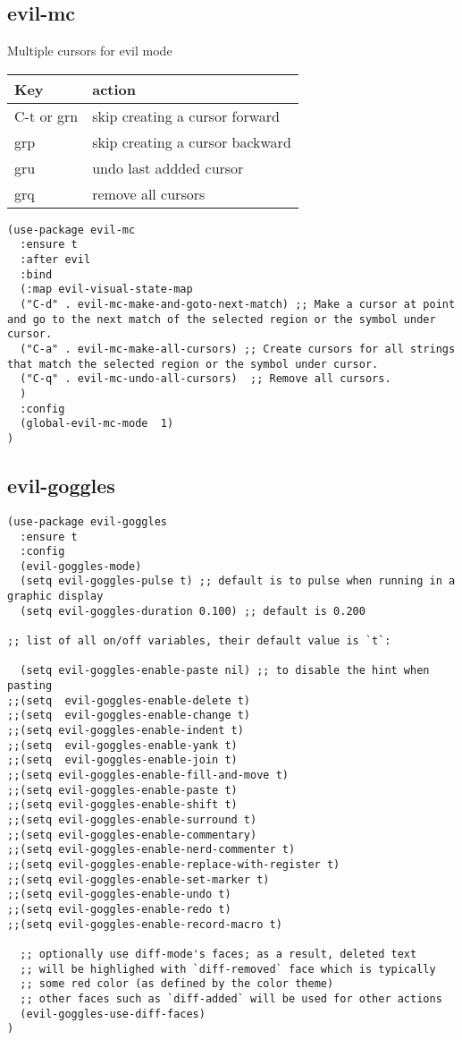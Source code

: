 \documentclass[11pt]{article}
\begin{document}
\subsection*{evil-mc}
\label{sec:org93a0a77}

Multiple cursors for evil mode

\begin{center}
\begin{tabular}{ll}
\hline
Key & action\\
\hline
C-t or grn & skip creating a cursor forward\\
grp & skip creating a cursor backward\\
gru & undo last addded cursor\\
grq & remove all cursors\\
\hline
\end{tabular}
\end{center}

\begin{verbatim}
(use-package evil-mc
  :ensure t
  :after evil
  :bind
  (:map evil-visual-state-map
  ("C-d" . evil-mc-make-and-goto-next-match) ;; Make a cursor at point and go to the next match of the selected region or the symbol under cursor.
  ("C-a" . evil-mc-make-all-cursors) ;; Create cursors for all strings that match the selected region or the symbol under cursor.
  ("C-q" . evil-mc-undo-all-cursors)  ;; Remove all cursors.
  )
  :config
  (global-evil-mc-mode  1)
)
\end{verbatim}

\subsection*{evil-goggles}
\label{sec:org0653787}

\begin{verbatim}
(use-package evil-goggles
  :ensure t
  :config
  (evil-goggles-mode)
  (setq evil-goggles-pulse t) ;; default is to pulse when running in a graphic display
  (setq evil-goggles-duration 0.100) ;; default is 0.200

;; list of all on/off variables, their default value is `t`:

  (setq evil-goggles-enable-paste nil) ;; to disable the hint when pasting
;;(setq  evil-goggles-enable-delete t)
;;(setq  evil-goggles-enable-change t)
;;(setq evil-goggles-enable-indent t)
;;(setq  evil-goggles-enable-yank t)
;;(setq  evil-goggles-enable-join t)
;;(setq evil-goggles-enable-fill-and-move t)
;;(setq evil-goggles-enable-paste t)
;;(setq evil-goggles-enable-shift t)
;;(setq evil-goggles-enable-surround t)
;;(setq evil-goggles-enable-commentary)
;;(setq evil-goggles-enable-nerd-commenter t)
;;(setq evil-goggles-enable-replace-with-register t)
;;(setq evil-goggles-enable-set-marker t)
;;(setq evil-goggles-enable-undo t)
;;(setq evil-goggles-enable-redo t)
;;(setq evil-goggles-enable-record-macro t)

  ;; optionally use diff-mode's faces; as a result, deleted text
  ;; will be highlighed with `diff-removed` face which is typically
  ;; some red color (as defined by the color theme)
  ;; other faces such as `diff-added` will be used for other actions
  (evil-goggles-use-diff-faces)
)
\end{verbatim}
\end{document}
